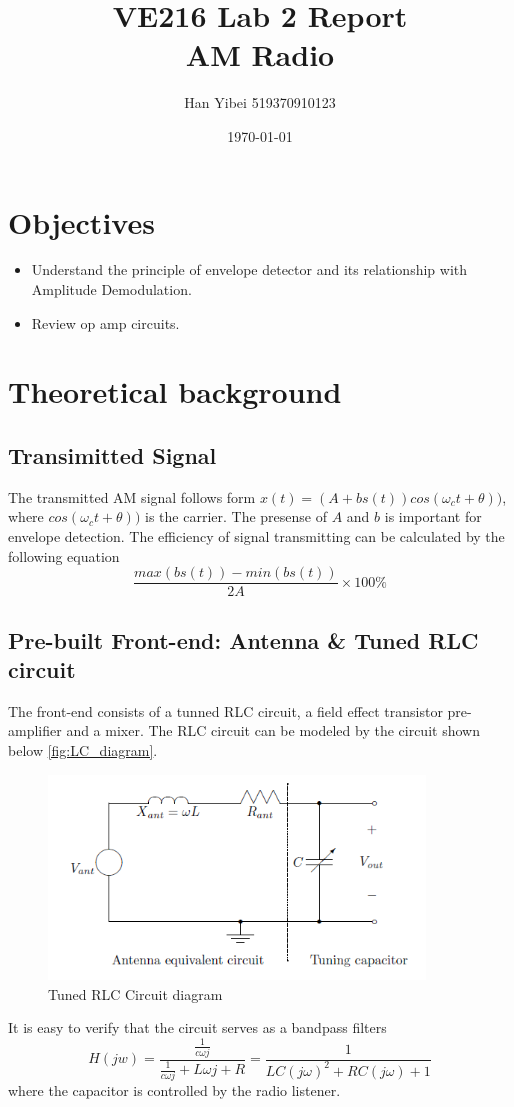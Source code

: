 \documentclass[a4paper]{article}
\title{\textbf{VE216 Lab 2 Report\\AM Radio}}
\author{
    \Large Han Yibei
    \normalsize 519370910123
}
\date{\today}
\begin{document}
    \maketitle
    \tableofcontents
    \newpage




    \section{Objectives}
    \begin{itemize}
        \item Understand the principle of envelope detector and its relationship with Amplitude Demodulation.
        \item Review op amp circuits.
    \end{itemize}

    \section{Theoretical background}
    \subsection{Transimitted Signal}
    The transmitted AM signal follows form $x(t) = (A+bs(t))cos(\omega_ct+\theta))$, where $cos(\omega_ct+\theta))$ is the carrier. The presense of $A$ and $b$ is important for envelope detection. The efficiency of signal transmitting can be calculated by the following equation
    \begin{equation*}
        \frac{max(bs(t))-min(bs(t))}{2A} \times 100 \%
    \end{equation*}

    \subsection{Pre-built Front-end: Antenna \& Tuned RLC circuit}
    The front-end consists of a tunned RLC circuit, a field effect transistor pre-amplifier and a mixer. The RLC circuit can be modeled by the circuit shown below \autoref{fig:LC_diagram}.
    \begin{figure}[h]
        \centering
        \includegraphics[width=10cm]{tuned.png}
        \caption{Tuned RLC Circuit diagram}
        \label{fig:LC_diagram}
    \end{figure}
    It is easy to verify that the circuit serves as a bandpass filters
    \begin{equation*}
        H(jw) = \frac{\frac{1}{c\omega j}}{\frac{1}{c\omega j}+L\omega j+R} = \frac{1}{LC(j\omega)^2+RC(j\omega)+1}
    \end{equation*}
    where the capacitor is controlled by the radio listener.
    
\end{document}
